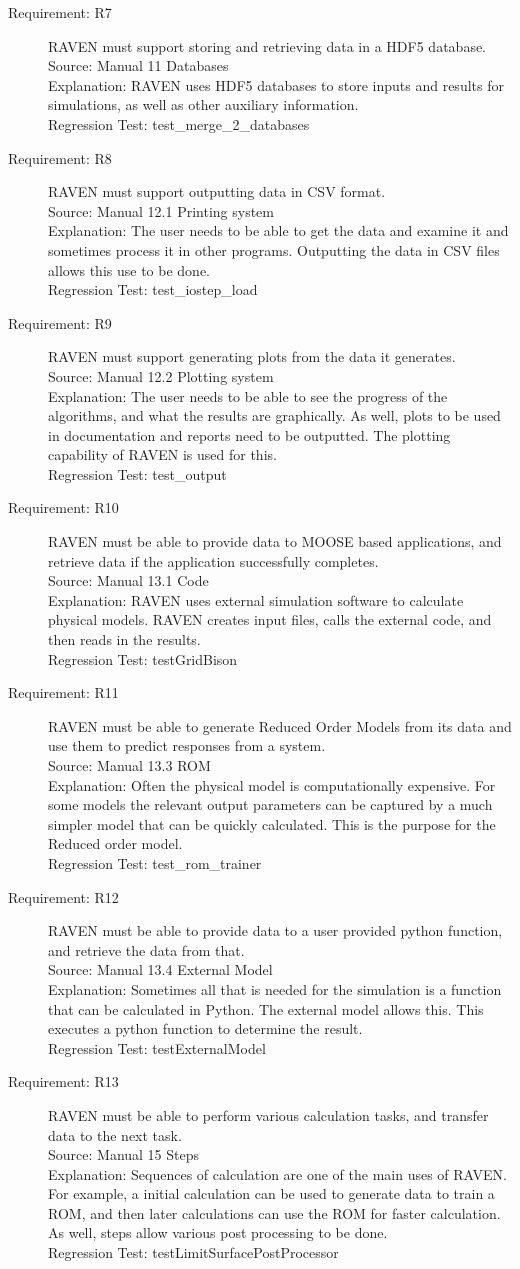 \documentclass{article}
\newcommand{\requirement}[5]{\item[Requirement: #1] #2 \\Source: #3\\Explanation: #4\\Regression Test: #5}
\begin{document}
\begin{description}
\requirement{R7}{RAVEN must support storing and retrieving data in a HDF5 database.}
{Manual 11 Databases}
{RAVEN uses HDF5 databases to store inputs and results for simulations, as well as other auxiliary information.}
{test\_merge\_2\_databases}

\requirement{R8}{RAVEN must support outputting data in CSV format.}
{Manual 12.1 Printing system}
{The user needs to be able to get the data and examine it and sometimes process it in other programs.  Outputting the data in CSV files allows this use to be done.}
{test\_iostep\_load}

\requirement{R9}{RAVEN must support generating plots from the data it generates.}
{Manual 12.2 Plotting system}
{The user needs to be able to see the progress of the algorithms, and what the results are graphically.  As well, plots to be used in documentation and reports need to be outputted.  The plotting capability of RAVEN is used for this.}
{test\_output}

\requirement{R10}{RAVEN must be able to provide data to MOOSE based applications, and retrieve data if the application successfully completes.}
{Manual 13.1 Code}
{RAVEN uses external simulation software to calculate physical models.  RAVEN creates input files, calls the external code, and then reads in the results.}
{testGridBison}

\requirement{R11}{RAVEN must be able to generate Reduced Order Models from its data and use them to predict responses from a system.}
{Manual 13.3 ROM}
{Often the physical model is computationally expensive.  For some models the relevant output parameters can be captured by a much simpler model that can be quickly calculated.  This is the purpose for the Reduced order model.}
{test\_rom\_trainer}

\requirement{R12}{RAVEN must be able to provide data to a user provided python function, and retrieve the data from that.}
{Manual 13.4 External Model}
{Sometimes all that is needed for the simulation is a function that can be calculated in Python.  The external model allows this.  This executes a python function to determine the result.}
{testExternalModel}

\requirement{R13}{RAVEN must be able to perform various calculation tasks, and transfer data to the next task.}
{Manual 15 Steps}
{Sequences of calculation are one of the main uses of RAVEN.  For example, a initial calculation can be used to generate data to train a ROM, and then later calculations can use the ROM for faster calculation.  As well, steps allow various post processing to be done.}
{testLimitSurfacePostProcessor}


\end{description}
\end{document}
